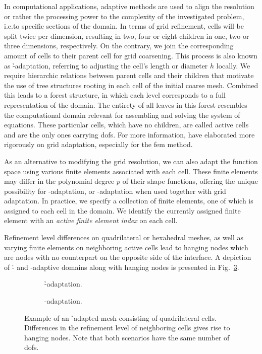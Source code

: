 In computational applications, adaptive methods are used to align the resolution or rather the processing power to the complexity of the investigated problem, i.e.\@ to specific sections of the domain. In terms of grid refinement, cells will be split twice per dimension, resulting in two, four or eight children in one, two or three dimensions, respectively. On the contrary, we join the corresponding amount of cells to their parent cell for grid coarsening. This process is also known as \h-adaptation, referring to adjusting the cell's length or diameter \(h\) locally. We require hierarchic relations between parent cells and their children that motivate the use of tree structures rooting in each cell of the initial coarse mesh. Combined this leads to a forest structure, in which each level corresponds to a full representation of the domain. The entirety of all leaves in this forest resembles the computational domain relevant for assembling and solving the system of equations. These particular cells, which have no children, are called active cells and are the only ones carrying \glspl{dof}. For more information, \textcite{bangerth2003} have elaborated more rigorously on grid adaptation, especially for the \gls{fem} method.

As an alternative to modifying the grid resolution, we can also adapt the function space using various finite elements associated with each cell. These finite elements may differ in the polynomial degree $p$ of their shape functions, offering the unique possibility for \p-adaptation, or \hp-adaptation when used together with grid adaptation. In practice, we specify a collection of finite elements, one of which is assigned to each cell in the domain. We identify the currently assigned finite element with an \textit{active finite element index} on each cell.

Refinement level differences on quadrilateral or hexahedral meshes, as well as varying finite elements on neighboring active cells lead to hanging nodes which are nodes with no counterpart on the opposite side of the interface. A depiction of \h- and \p-adaptive domains along with hanging nodes is presented in Fig.~\ref{fig:hpadaptivity}.

\begin{figure}
\begin{subfigure}{0.49\textwidth}
  \centering
  
  \caption{\h-adaptation.}
  \label{fig:hapaptivity}
\end{subfigure}
\begin{subfigure}{0.49\textwidth}
  \centering
  
  \caption{\p-adaptation.}
  \label{fig:papaptivity}
\end{subfigure}
\caption{Example of an \h-adapted mesh consisting of quadrilateral cells. Differences in the refinement level of neighboring cells gives rise to hanging nodes. Note that both scenarios have the same number of \glspl{dof}.}
\label{fig:hpadaptivity}
\end{figure}

